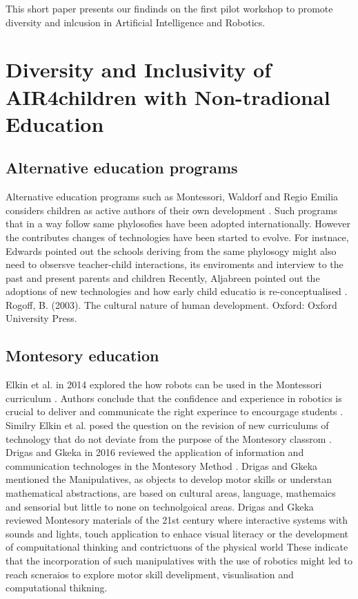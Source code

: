 \documentclass[conference]{IEEEtran}
\begin{document}
This short paper presents our findinds on the first pilot workshop to promote diversity and inlcusion in Artificial Intelligence and Robotics.

\section{Diversity and Inclusivity of AIR4children with Non-tradional Education}

\subsection{Alternative education programs}
Alternative education programs such as Montessori, Waldorf and Regio Emilia considers children as active authors of their own development \cite{edwards2002}.
Such programs that in a way follow same phylosofies have been adopted internationally.
However the contributes changes of technologies have been started to evolve. 
For instnace, Edwards pointed out the schools deriving from the same phylosogy might also need to obsersve teacher-child interactions, its enviroments and interview to the past and present parents and children \cite{edwards2002}
Recently, Aljabreen pointed out the adoptions of new technologies and how early child educatio is re-conceptualised \cite{Aljabreen2020}.
Rogoff, B. (2003). The cultural nature of human development. Oxford: Oxford University Press.

\subsection{Montesory education}
Elkin et al. in 2014 explored the how robots can be used in the Montessori curriculum \cite{elkin2014}.
Authors conclude that the confidence and experience in robotics is crucial to deliver and communicate the right experince to encourgage students \cite{elkin2014}.
Similry Elkin et al. posed the question on the revision of new curriculums of technology that do not deviate from the purpose of the Montesory classrom \cite{elkin2014}.
Drigas and Gkeka in 2016 reviewed the application of information and communication technologes in the Montesory Method \cite{DrigasGkeka2016}.
Drigas and Gkeka mentioned the Manipulatives, as objects to develop motor skills or understan mathematical abstractions, are based on cultural areas, language, mathemaics and sensorial but little to none on technolgoical areas.
Drigas and Gkeka reviewed Montesory materials of the 21st century where interactive systems with sounds and lights, touch application to enhace visual literacy or the development of compuitational thinking and contrictuons of the physical world \cite{DrigasGkeka2016}
These indicate that the incorporation of such manipulatives with the use of robotics might led to reach scneraios to explore motor skill develipment, visualisation and computational thikning. 
\end{document}
